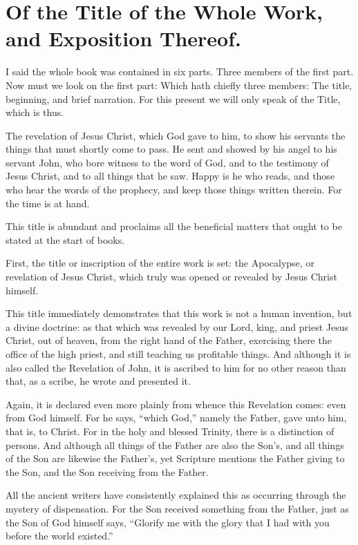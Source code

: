 \chapter[Sermon 2. Of the Title of the Whole Work, and Exposition Thereof.]{Of the Title of the Whole Work, and Exposition Thereof.}
\label{sermon:002}

I said the whole book was contained in six parts. Three members of the first part. Now must we look on the first part: Which hath chiefly three members: The title, beginning, and brief narration. For this present we will only speak of the Title, which is thus.

The revelation of Jesus Christ, which God gave to him, to show his servants the things that must shortly come to pass. He sent and showed by his angel to his servant John, who bore witness to the word of God, and to the testimony of Jesus Christ, and to all things that he saw. Happy is he who reads, and those who hear the words of the prophecy, and keep those things written therein. For the time is at hand.

This title is abundant and proclaims all the beneficial matters that ought to be stated at the start of books.

First, the title or inscription of the entire work is set: the Apocalypse, or revelation of Jesus Christ, which truly was opened or revealed by Jesus Christ himself.

This title immediately demonstrates that this work is not a human invention, but a divine doctrine: as that which was revealed by our Lord, king, and priest Jesus Christ, out of heaven, from the right hand of the Father, exercising there the office of the high priest, and still teaching us profitable things. And although it is also called the Revelation of John, it is ascribed to him for no other reason than that, as a scribe, he wrote and presented it.

Again, it is declared even more plainly from whence this Revelation comes: even from God himself. For he says, “which God,” namely the Father, gave unto him, that is, to Christ. For in the holy and blessed Trinity, there is a distinction of persons. And although all things of the Father are also the Son’s, and all things of the Son are likewise the Father’s, yet Scripture mentions the Father giving to the Son, and the Son receiving from the Father.

All the ancient writers have consistently explained this as occurring through the mystery of dispensation. For the Son received something from the Father, just as the Son of God himself says, “Glorify me with the glory that I had with you before the world existed.”

